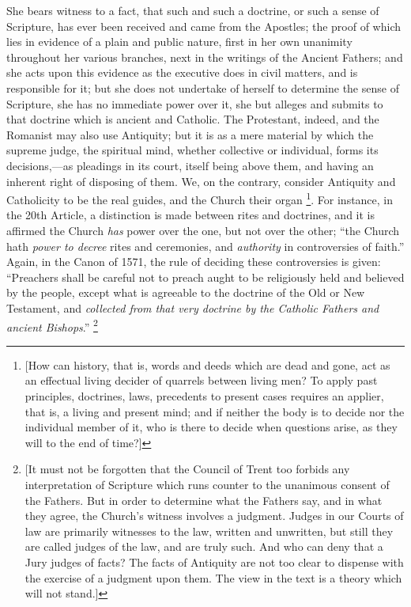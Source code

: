 She bears witness to a fact, that such and such a doctrine, or such
a sense of Scripture, has ever been received and came from the
Apostles; the proof of which lies in evidence of a plain and public
nature, first in her own unanimity throughout her various branches,
next in the writings of the Ancient Fathers; and she acts upon this
evidence as the executive does in civil matters, and is responsible
for it; but she does not undertake of herself to determine the sense
of Scripture, she has no immediate power over it, she but alleges and
submits to that doctrine which is ancient and Catholic. The
Protestant, indeed, and the Romanist may also use Antiquity; but it is
as a mere material by which the supreme judge, the spiritual mind,
whether collective or individual, forms its decisions,—as pleadings
in its court, itself being above them, and having an inherent right of
disposing of them. We, on the contrary, consider Antiquity and
Catholicity to be the real guides, and the Church their organ \footnote{[How can history, that is, words and deeds
which are dead and gone, act as an effectual living decider of
quarrels between living men? To apply past principles, doctrines,
laws, precedents to present cases requires an applier, that is, a
living and present mind; and if neither the body is to decide nor the
individual member of it, who is there to decide when questions arise,
as they will to the end of time?]}. For instance, in the 20th Article, a distinction is made
between rites and doctrines, and it is affirmed the Church \emph{has}
power over the one, but not over the other; ``the Church hath \emph{power
to decree} rites and ceremonies, and \emph{authority} in controversies of
faith.'' Again, in the Canon of 1571, the rule of deciding these
controversies is given: ``Preachers shall be careful not to preach
aught to be religiously held and believed by the people, except what
is agreeable to the doctrine of the Old or New Testament, and \emph{collected
from that very doctrine by the Catholic Fathers and ancient Bishops}.''
\footnote{[It must not be forgotten that the Council
of Trent too forbids any interpretation of Scripture which runs
counter to the unanimous consent of the Fathers. But in order to
determine what the Fathers say, and in what they agree, the Church's
witness involves a judgment. Judges in our Courts of law are primarily
witnesses to the law, written and unwritten, but still they are called
judges of the law, and are truly such. And who can deny that a Jury
judges of facts? The facts of Antiquity are not too clear to dispense
with the exercise of a judgment upon them. The view in the text is a
theory which will not stand.]}

